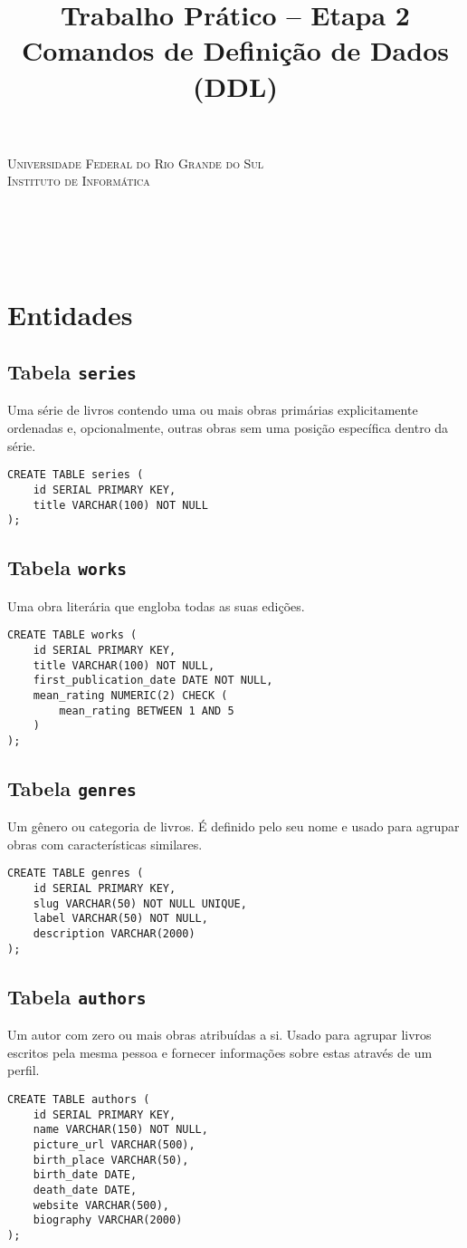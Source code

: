 \documentclass[12pt]{article}
\title{
    Trabalho Prático – Etapa 2 \\[8pt]
    \Large Comandos de Definição de Dados (DDL)
}
\renewcommand{\maketitle}{
    \begin{titlepage}
        \begin{center}
            {\scshape Universidade Federal do Rio Grande do Sul\\Instituto de Informática} \\
            \vspace*{\fill}
            {\large \thecourse} \\[24pt]
            {\Huge \thetitle} \\[48pt]
            \theauthors \\
            \vspace*{\fill}
            \theprofessor \\[2pt]
            \thesemester
        \end{center}
    \end{titlepage}
}
\begin{document}
\maketitle

\section{Entidades}

\subsection{Tabela \texttt{series}}
Uma série de livros contendo uma ou mais obras primárias explicitamente ordenadas e, opcionalmente, outras obras sem uma posição específica dentro da série.
\begin{lstlisting}
CREATE TABLE series (
    id SERIAL PRIMARY KEY,
    title VARCHAR(100) NOT NULL
);
\end{lstlisting}

\subsection{Tabela \texttt{works}}
Uma obra literária que engloba todas as suas edições.
\begin{lstlisting}
CREATE TABLE works (
    id SERIAL PRIMARY KEY,
    title VARCHAR(100) NOT NULL,
    first_publication_date DATE NOT NULL,
    mean_rating NUMERIC(2) CHECK (
        mean_rating BETWEEN 1 AND 5
    )
);
\end{lstlisting}

\subsection{Tabela \texttt{genres}}
Um gênero ou categoria de livros. É definido pelo seu nome e usado para agrupar obras com características similares.
\begin{lstlisting}
CREATE TABLE genres (
    id SERIAL PRIMARY KEY,
    slug VARCHAR(50) NOT NULL UNIQUE,
    label VARCHAR(50) NOT NULL,
    description VARCHAR(2000)
);
\end{lstlisting}

\newpage

\subsection{Tabela \texttt{authors}}
Um autor com zero ou mais obras atribuídas a si. Usado para agrupar livros escritos pela mesma pessoa e fornecer informações sobre estas através de um perfil.
\begin{lstlisting}
CREATE TABLE authors (
    id SERIAL PRIMARY KEY,
    name VARCHAR(150) NOT NULL,
    picture_url VARCHAR(500),
    birth_place VARCHAR(50),
    birth_date DATE,
    death_date DATE,
    website VARCHAR(500),
    biography VARCHAR(2000)
);
\end{lstlisting}
\end{document}
